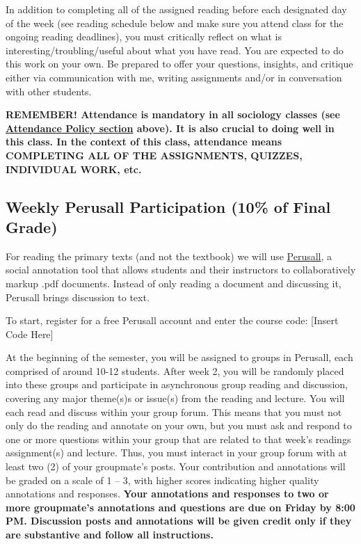 \documentclass[11pt,]{article}
\begin{document}
In addition to completing all of the assigned reading before each
designated day of the week (see reading schedule below and make sure you
attend class for the ongoing reading deadlines), you must critically
reflect on what is interesting/troubling/useful about what you have
read. You are expected to do this work on your own. Be prepared to offer
your questions, insights, and critique either via communication with me,
writing assignments and/or in conversation with other students.

\textbf{REMEMBER! Attendance is mandatory in all sociology classes (see
\protect\hyperlink{attendance}{Attendance Policy section} above). It is
also crucial to doing well in this class. In the context of this class,
attendance means COMPLETING ALL OF THE ASSIGNMENTS, QUIZZES, INDIVIDUAL
WORK, etc.}

\hypertarget{weekly-perusall-participation-10-of-final-grade}{%
\subsection{Weekly Perusall Participation (10\% of Final
Grade)}\label{weekly-perusall-participation-10-of-final-grade}}

For reading the primary texts (and not the textbook) we will use
\href{https://support.perusall.com/hc/en-us}{Perusall}, a social
annotation tool that allows students and their instructors to
collaboratively markup .pdf documents. Instead of only reading a
document and discussing it, Perusall brings discussion to text.

To start, register for a free Perusall account and enter the course
code: {[}Insert Code Here{]}

At the beginning of the semester, you will be assigned to groups in
Perusall, each comprised of around 10-12 students. After week 2, you
will be randomly placed into these groups and participate in
asynchronous group reading and discussion, covering any major theme(s)s
or issue(s) from the reading and lecture. You will each read and discuss
within your group forum. This means that you must not only do the
reading and annotate on your own, but you must ask and respond to one or
more questions within your group that are related to that week's
readings assignment(s) and lecture. Thus, you must interact in your
group forum with at least two (2) of your groupmate's posts. Your
contribution and annotations will be graded on a scale of 1 -- 3, with
higher scores indicating higher quality annotations and responses.
\textbf{Your annotations and responses to two or more groupmate's
annotations and questions are due on Friday by 8:00 PM. Discussion posts
and annotations will be given credit only if they are substantive and
follow all instructions.}
\end{document}
